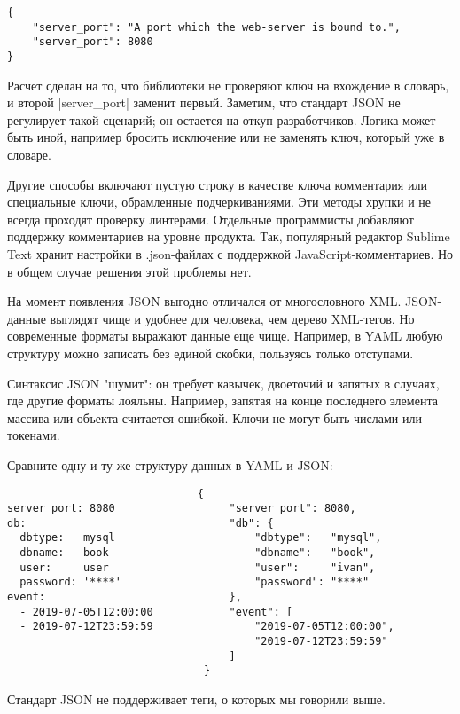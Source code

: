 \begin{verbatim}
{
    "server_port": "A port which the web-server is bound to.",
    "server_port": 8080
}
\end{verbatim}

Расчет сделан на то, что библиотеки не проверяют ключ на вхождение в словарь, и
второй \spverb|server_port| заменит первый. Заметим, что стандарт JSON не регулирует
такой сценарий; он остается на откуп разработчиков. Логика может быть иной,
например бросить исключение или не заменять ключ, который уже в словаре.

Другие способы включают пустую строку в качестве ключа комментария или
специальные ключи, обрамленные подчеркиваниями. Эти методы хрупки и не всегда
проходят проверку линтерами. Отдельные программисты добавляют поддержку
комментариев на уровне продукта. Так, популярный редактор Sublime Text хранит
настройки в .json-файлах с поддержкой JavaScript-комментариев. Но в общем случае
решения этой проблемы нет.

На момент появления JSON выгодно отличался от многословного XML. JSON-данные
выглядят чище и удобнее для человека, чем дерево XML-тегов. Но современные
форматы выражают данные еще чище. Например, в YAML любую структуру можно
записать без единой скобки, пользуясь только отступами.

Синтаксис JSON "шумит": он требует кавычек, двоеточий и запятых в случаях, где
другие форматы лояльны. Например, запятая на конце последнего элемента массива
или объекта считается ошибкой. Ключи не могут быть числами или
токенами.

Сравните одну и ту же структуру данных в YAML и JSON:

\begin{verbatim}
                              {
server_port: 8080                  "server_port": 8080,
db:                                "db": {
  dbtype:   mysql                      "dbtype":   "mysql",
  dbname:   book                       "dbname":   "book",
  user:     user                       "user":     "ivan",
  password: '****'                     "password": "****"
event:                             },
  - 2019-07-05T12:00:00            "event": [
  - 2019-07-12T23:59:59                "2019-07-05T12:00:00",
                                       "2019-07-12T23:59:59"
                                   ]
                               }
\end{verbatim}

Стандарт JSON не поддерживает теги, о которых мы говорили выше.

